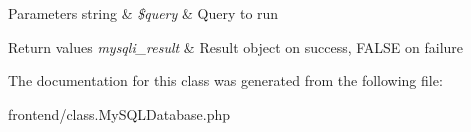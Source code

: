 \begin{DoxyParams}[1]{Parameters}
string & {\em \$query} & Query to run \\
\hline
\end{DoxyParams}

\begin{DoxyRetVals}{Return values}
{\em mysqli\-\_\-result} & Result object on success, F\-A\-L\-S\-E on failure \\
\hline
\end{DoxyRetVals}


The documentation for this class was generated from the following file\-:\begin{DoxyCompactItemize}
\item 
frontend/class.\-My\-S\-Q\-L\-Database.\-php\end{DoxyCompactItemize}
